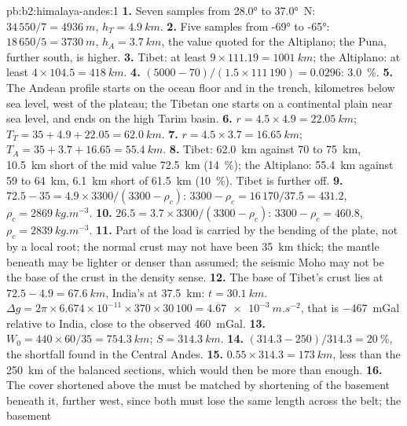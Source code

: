 \begin{solution}{pb:b2:himalaya-andes:1}
\textbf{1.} Seven samples from \ang{28.0} to \ang{37.0}~N: $34\,550/7 = \qty{4936}{m}$, $h_T
= \qty{4.9}{km}$.
\textbf{2.} Five samples from \ang{-69} to \ang{-65}: $18\,650/5 = \qty{3730}{m}$, $h_A =
\qty{3.7}{km}$, the value quoted for the Altiplano; the Puna, further south, is higher.
\textbf{3.} Tibet: at least $9\times111.19 = \qty{1001}{km}$; the Altiplano: at least $4\times
104.5 = \qty{418}{km}$.
\textbf{4.} $(5000 - 70)/(1.5\times111\,190) = 0.0296$: \qty{3.0}{\percent}.
\textbf{5.} The Andean profile starts on the ocean floor and in the trench, kilometres below
sea level, west of the plateau; the Tibetan one starts on a continental plain near sea level,
and ends on the high Tarim basin.
\textbf{6.} $r = 4.5\times4.9 = \qty{22.05}{km}$; $T_T = 35 + 4.9 + 22.05 = \qty{62.0}{km}$.
\textbf{7.} $r = 4.5\times3.7 = \qty{16.65}{km}$; $T_A = 35 + 3.7 + 16.65 = \qty{55.4}{km}$.
\textbf{8.} Tibet: \qty{62.0}{km} against 70 to \qty{75}{km}, \qty{10.5}{km} short of the mid
value \qty{72.5}{km} (\qty{14}{\percent}); the Altiplano: \qty{55.4}{km} against 59 to
\qty{64}{km}, \qty{6.1}{km} short of \qty{61.5}{km} (\qty{10}{\percent}). Tibet is further off.
\textbf{9.} $72.5 - 35 = 4.9\times3300/(3300 - \rho_c)$: $3300 - \rho_c = 16\,170/37.5 =
431.2$, $\rho_c = \qty{2869}{kg.m^{-3}}$.
\textbf{10.} $26.5 = 3.7\times3300/(3300 - \rho_c)$: $3300 - \rho_c = 460.8$, $\rho_c =
\qty{2839}{kg.m^{-3}}$.
\textbf{11.} Part of the load is carried by the bending of the plate, not by a local root; the
normal crust may not have been \qty{35}{km} thick; the mantle beneath may be lighter or denser
than assumed; the seismic Moho may not be the base of the crust in the density sense.
\textbf{12.} The base of Tibet's crust lies at $72.5 - 4.9 = \qty{67.6}{km}$, India's at
\qty{37.5}{km}: $t = \qty{30.1}{km}$. $\Delta g = 2\pi\times6.674\times10^{-11}\times370\times
30\,100 = \qty{4.67e-3}{m.s^{-2}}$, that is \qty{-467}{mGal} relative to India, close to the
observed \qty{460}{mGal}.
\textbf{13.} $W_0 = 440\times60/35 = \qty{754.3}{km}$; $S = \qty{314.3}{km}$.
\textbf{14.} $(314.3 - 250)/314.3 = \qty{20}{\percent}$, the shortfall found in the Central
Andes.
\textbf{15.} $0.55\times314.3 = \qty{173}{km}$, less than the \qty{250}{km} of the balanced
sections, which would then be more than enough.
\textbf{16.} The cover shortened above the  must be matched by shortening of the
basement beneath it, further west, since both must lose the same length across the belt; the basement

\end{solution}
